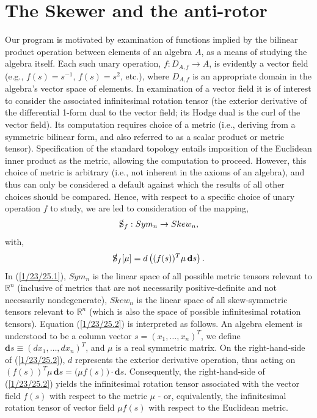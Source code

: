 \documentclass{amsart}
\theoremstyle{definition}
\numberwithin{theorem}{section}
\numberwithin{equation}{section}
\begin{document}
\section{The Skewer and the anti-rotor} Our program is motivated by examination of functions implied by the bilinear product operation between elements of an algebra $A$, as a means of studying the algebra itself.
Each such unary operation, $f:D_{A,f}\rightarrow A$, is evidently a vector field (e.g., $f(s)=s^{-1}$, $f(s)=s^2$, etc.), where $D_{A,f}$ is an appropriate domain in the algebra's vector space of elements.  In examination of a vector field it is of interest to consider the associated infinitesimal rotation tensor (the exterior derivative of the differential 1-form dual to the vector field; its Hodge dual is the curl of the vector field).  Its computation requires choice of a metric (i.e., deriving from a symmetric bilinear form, and also referred to as a scalar product or metric tensor).  Specification of the standard topology entails imposition of the Euclidean inner product as the metric, allowing the computation to proceed.  However, this choice of metric is arbitrary (i.e., not inherent in the axioms of an algebra), and thus can only be considered a default against which the results of all other choices should be compared.  Hence, with respect to a specific choice of unary operation $f$ to study, we are led to consideration of the mapping, \begin{equation}\label{1/23/25.1} \slashed{\text{S}}_f: Sym_n \rightarrow Skew_n,\end{equation}  
with, \begin{equation}\label{1/23/25.2} \slashed{\text{S}}_f[\mu] = d\left((f(s))^T \mu \,\mathbf{d}s\right).  \end{equation}
In (\ref{1/23/25.1}), $Sym_n$ is the linear space of all possible metric tensors relevant to $\mathbb{R}^n$ (inclusive of metrics that are not necessarily positive-definite and not necessarily nondegenerate),  $Skew_n$ is the linear space of all skew-symmetric tensors relevant to $\mathbb{R}^n$ (which is also the space of possible infinitesimal rotation tensors).  Equation (\ref{1/23/25.2}) is interpreted as follows.  An algebra element is understood to be a column vector $s=(x_1,\dots,x_n)^T$, we define $\mathbf{d}s \equiv (dx_1,\dots,dx_n)^T$, and $\mu$ is a real symmetric matrix.  On the right-hand-side of (\ref{1/23/25.2}), $d$ represents the exterior derivative operation, thus acting on $(f(s))^T \mu \,\mathbf{d}s = \big(\mu f(s)\big)\cdot\mathbf{d}s$.   Consequently, the right-hand-side of (\ref{1/23/25.2}) yields the infinitesimal rotation tensor associated with the vector field $f(s)$ with respect to the metric $\mu$ - or, equivalently, the infinitesimal rotation tensor of vector field $\mu f(s)$ with respect to the Euclidean metric.
\end{document}
